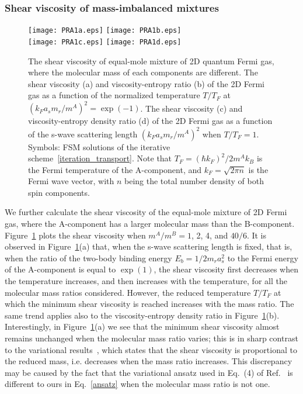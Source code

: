 \subsubsection{Shear viscosity of mass-imbalanced mixtures}



\begin{figure}[t]
	\centering
	\texttt{[image: PRA1a.eps]}
	\hskip 0.5cm
	\texttt{[image: PRA1b.eps]}\\
	\vskip 0.5cm
	\texttt{[image: PRA1c.eps]}
	\hskip 0.5cm
	\texttt{[image: PRA1d.eps]}
	\caption{The shear viscosity of equal-mole mixture of 2D quantum Fermi gas, where the molecular mass of each components are different. 
		The shear viscosity (a) and viscosity-entropy ratio (b) of the 2D Fermi gas as a function of the  normalized temperature $T/T_F$ at $(k_Fa_sm_r/m^A)^2={\exp(-1)}$. The shear viscosity (c) and viscosity-entropy density ratio (d) of the 2D Fermi gas as a function of the s-wave scattering length $(k_Fa_sm_r/m^A)^2$ when $T/T_F=1$. Symbols:  FSM solutions of the iterative scheme~\eqref{iteration_transport}. Note that  $T_F=(\hbar{k_F})^2/2m^Ak_B$ is the Fermi temperature of the A-component, and  $k_F=\sqrt{2\pi{n}}$ is the Fermi wave vector, with $n$ being the total number density of both spin components.}\label{PRA_Bruun}
\end{figure}


We further calculate the shear viscosity of the equal-mole mixture of 2D Fermi gas, where the A-component has a larger molecular mass than the B-component.  Figure~\ref{PRA_Bruun} plots the shear viscosity when $m^A/m^B=1$, 2, 4, and $40/6$. It is observed in Figure~\ref{PRA_Bruun}(a) that, when the s-wave scattering length is fixed, that is, when the ratio of the two-body binding energy $E_b=1/2m_ra_s^2$ to the Fermi energy of the A-component is equal to $\exp(1)$, the shear viscosity first decreases when the temperature increases, and then increases with the temperature, for all the molecular mass ratios considered. However, the reduced temperature $T/T_F$ at which the minimum shear viscosity is reached increases with the mass ratio. The same trend applies also to the viscosity-entropy density ratio in Figure~\ref{PRA_Bruun}(b). Interestingly, in Figure~\ref{PRA_Bruun}(a) we see that the minimum shear viscosity almost remains unchanged when the molecular mass ratio varies; this is in sharp contrast to the variational results~\cite{bruun_2012}, which states that the shear viscosity is proportional to the reduced mass, i.e.  decreases when the mass ratio increases. This discrepancy may be caused by the fact that the variational ansatz used in Eq.~(4) of Ref.~\cite{bruun_2012} is different to ours in Eq.~\eqref{ansatz} when the molecular mass ratio is not one.


